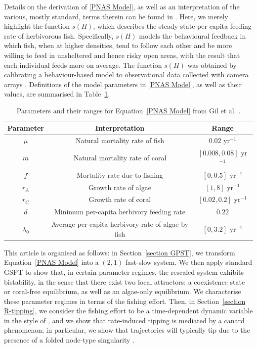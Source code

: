 \documentclass{article}
\theoremstyle{definition}
\numberwithin{equation}{section}
\begin{document}
Details on the derivation of \eqref{PNAS Model}, as well as an interpretation of the various, mostly standard, terms therein can be found in \cite{gil2020}. Here, we merely highlight the function $s(H)$, which describes the steady‑state per‑capita feeding rate of herbivorous fish. Specifically, $s(H)$ models the behavioural feedback in which fish, when at higher densities, tend to follow each other and be more willing to feed in unsheltered and hence risky open areas, with the result that each individual feeds more on average. The function $s(H)$ was obtained by calibrating a behaviour-based model to observational data collected with camera arrays \cite{gil_2017_social}.
Definitions of the model parameters in \eqref{PNAS Model}, as well as their values, are summarised in Table~\ref{param_table}. 

\begin{table}[H]
    \centering
    \begin{tabular}{|c|c|c|} 
    \hline
    \textbf{Parameter} & \textbf{Interpretation} & \textbf{Range} \\
    \hline
    
    \(\mu\) & Natural mortality rate of fish & $0.02$ yr$^{-1}$ \\
    \hline
    $m$ & Natural mortality rate of coral & $[0.008, 0.08]$ yr$^{-1}$ \\
    \hline
    \(f\) & Mortality rate due to fishing & $[0, 0.5]$ yr$^{-1}$ \\
    \hline
    \(r_A\) & Growth rate of algae & $[1, 8]$ yr$^{-1}$ \\
    \hline
    $r_C$ & Growth rate of coral & $[0.02, 0.2]$ yr$^{-1}$ \\
    \hline
    $d$ & Minimum per-capita herbivory feeding rate & $0.22$ \\
    \hline
    $\lambda_0$ & Average per-capita herbivory rate of algae by fish & $[0, 3.2]$ yr$^{-1}$ \\
    \hline
    \end{tabular}
    \caption{Parameters and their ranges for Equation~\eqref{PNAS Model} from Gil et al. \cite[Appendix]{gil2020}.}
    \label{param_table}
\end{table}

This article is organised as follows: in Section~\ref{section GPST}, we transform Equation~\eqref{PNAS Model} into a $(2,1)$ fast-slow system. We then apply standard GSPT \cite{MTSD} to show that, in certain parameter regimes, the rescaled system exhibits bistability, in the sense that there exist two local attractors: a coexistence state or coral-free equilibrium, as well as an algae-only equilibrium. We characterise these parameter regimes in terms of the fishing effort.  
Then, in Section~\ref{section R-tipping}, we consider the fishing effort to be a time-dependent dynamic variable in the style of \cite{Plankton-tipping, vanselow_2019_when}, and we show that rate-induced tipping is mediated by a canard phenomenon; in particular, we show that trajectories will typically tip due to the presence of a folded node-type singularity \cite{Canards}. 
\end{document}
